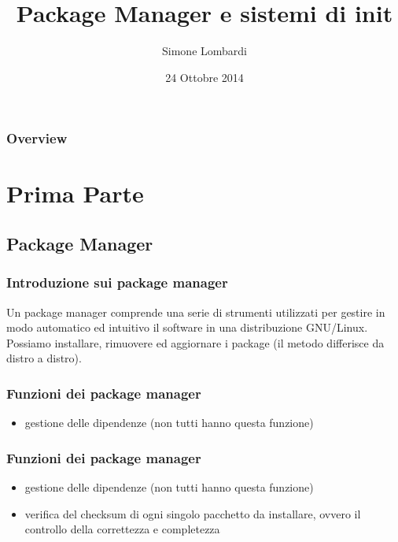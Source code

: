\documentclass{beamer}
\title[Linux Day 2014]{Package Manager e sistemi di init}
\author{Simone Lombardi}
\institute[HCSSLUG] 
{
Universit\`a degli studi di Salerno \\ 
\medskip
\textit{smlb@archlinux.info}  \\

http://smlb.me
}
\date{24 Ottobre 2014}
\begin{document}
\begin{frame}
\titlepage 
\end{frame}

\begin{frame}
\frametitle{Overview} 
\tableofcontents 
\end{frame}


\section{Prima Parte} 

\subsection{Package Manager} 

\begin{frame}
\frametitle{Introduzione sui package manager}
Un package manager comprende una serie di strumenti utilizzati per gestire in modo automatico ed intuitivo il software in una distribuzione GNU/Linux. Possiamo installare, rimuovere ed aggiornare i package (il metodo differisce da distro a distro). 
\end{frame}


\begin{frame}
	\frametitle{Funzioni dei package manager}
	\begin{itemize}
		\item gestione delle dipendenze (non tutti hanno questa funzione)
	\end{itemize}
\end{frame}


\begin{frame}
	\frametitle{Funzioni dei package manager}
	\begin{itemize}
		\item gestione delle dipendenze (non tutti hanno questa funzione)
		\item verifica del checksum di ogni singolo pacchetto da installare, ovvero il controllo della correttezza e completezza
	\end{itemize}
\end{frame}
\end{document}
